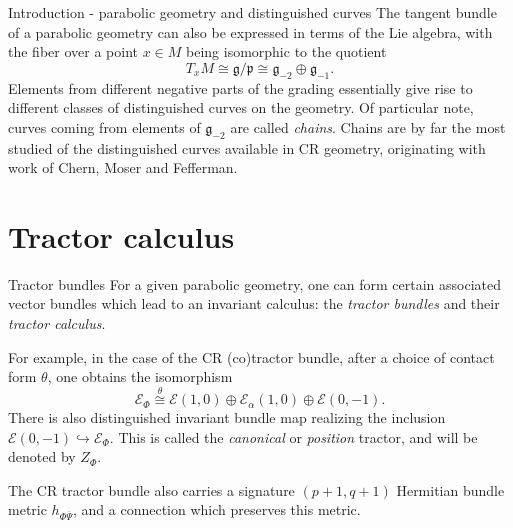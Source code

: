 \documentclass{beamer}
\begin{document}
\begin{frame}{Introduction - parabolic geometry and distinguished curves}
  The tangent bundle of a parabolic geometry can also be expressed in terms of
  the Lie algebra, with the fiber over a point $x \in M$ being isomorphic to the quotient
  \vfill
  \[
    T_x M \cong \mathfrak{g} / \mathfrak{p} \cong
    \mathfrak{g}_{-2} \oplus \mathfrak{g}_{-1}.
  \]
  \pause
  \vfill
  Elements from different negative parts of the grading essentially give rise to
  different classes of distinguished curves on the geometry.
  \vfill
  Of particular note, curves coming from elements of $\mathfrak{g}_{-2}$
  are called \emph{chains}.
  Chains are by far the most studied of the distinguished curves available in
  CR geometry, originating with work of Chern, Moser and Fefferman. 
\end{frame}

\section{Tractor calculus}

\begin{frame}{Tractor bundles}
  For a given parabolic geometry, one can form certain associated vector bundles
  which lead to an invariant calculus: the \emph{tractor bundles} and their \emph{tractor calculus}.
  \vfill
  \pause


  For example, in the case of the CR (co)tractor bundle, after a choice of contact form
  $\theta$, one obtains the isomorphism
  \[
    \mathcal{E}_\Phi \overset{\theta}{\cong} \mathcal{E} (1,0) \oplus \mathcal{E}_\alpha (1,0)
    \oplus \mathcal{E} (0,-1).
  \]
  \vfill
  \pause
  There is also distinguished invariant bundle map
  realizing the inclusion $\mathcal{E}(0,-1) \hookrightarrow \mathcal{E}_\Phi$.
  This is called the \emph{canonical} or \emph{position} tractor, and will be
  denoted by $Z_\Phi$.

  \vfill
  The CR tractor bundle also carries a signature $(p+1,q+1)$ Hermitian bundle
  metric $h_{\Phi \overline{\Psi}}$, and a connection which preserves this metric.

\end{frame}
\end{document}
